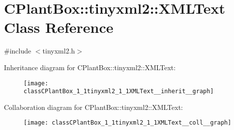\hypertarget{classCPlantBox_1_1tinyxml2_1_1XMLText}{}\section{C\+Plant\+Box\+:\+:tinyxml2\+:\+:X\+M\+L\+Text Class Reference}
\label{classCPlantBox_1_1tinyxml2_1_1XMLText}


{\ttfamily \#include $<$tinyxml2.\+h$>$}



Inheritance diagram for C\+Plant\+Box\+:\+:tinyxml2\+:\+:X\+M\+L\+Text\+:\nopagebreak
\begin{figure}[H]
\begin{center}
\leavevmode
\texttt{[image: classCPlantBox\_1\_1tinyxml2\_1\_1XMLText\_\_inherit\_\_graph]}
\end{center}
\end{figure}


Collaboration diagram for C\+Plant\+Box\+:\+:tinyxml2\+:\+:X\+M\+L\+Text\+:\nopagebreak
\begin{figure}[H]
\begin{center}
\leavevmode
\texttt{[image: classCPlantBox\_1\_1tinyxml2\_1\_1XMLText\_\_coll\_\_graph]}
\end{center}
\end{figure}
